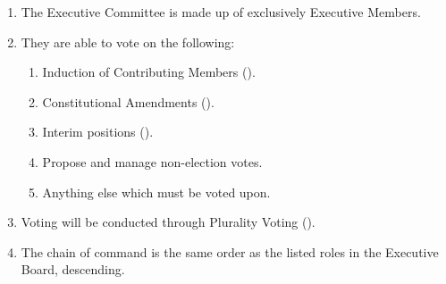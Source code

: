 
\begin{enumerate}
	\item The Executive Committee is made up of exclusively Executive Members.

	\item They are able to vote on the following:
		\begin{enumerate}
			\item Induction of Contributing Members ().

			\item Constitutional Amendments ().

			\item Interim positions ().

			\item Propose and manage non-election votes.

			\item Anything else which must be voted upon.
		\end{enumerate}

	\item Voting will be conducted through Plurality Voting ().

	\item The chain of command is the same order as the listed roles in the Executive
		Board, descending.
\end{enumerate}